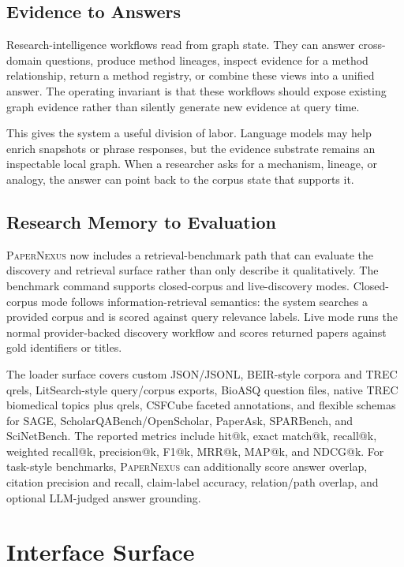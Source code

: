 \documentclass[11pt]{article}
\newcommand{\papernexus}{\textsc{PaperNexus}}
\begin{document}
\subsection{Evidence to Answers}

Research-intelligence workflows read from graph state. They can answer cross-domain questions, produce method lineages, inspect evidence for a method relationship, return a method registry, or combine these views into a unified answer. The operating invariant is that these workflows should expose existing graph evidence rather than silently generate new evidence at query time.

This gives the system a useful division of labor. Language models may help enrich snapshots or phrase responses, but the evidence substrate remains an inspectable local graph. When a researcher asks for a mechanism, lineage, or analogy, the answer can point back to the corpus state that supports it.

\subsection{Research Memory to Evaluation}

\papernexus{} now includes a retrieval-benchmark path that can evaluate the discovery and retrieval surface rather than only describe it qualitatively. The benchmark command supports closed-corpus and live-discovery modes. Closed-corpus mode follows information-retrieval semantics: the system searches a provided corpus and is scored against query relevance labels. Live mode runs the normal provider-backed discovery workflow and scores returned papers against gold identifiers or titles.

The loader surface covers custom JSON/JSONL, BEIR-style corpora and TREC qrels, LitSearch-style query/corpus exports, BioASQ question files, native TREC biomedical topics plus qrels, CSFCube faceted annotations, and flexible schemas for SAGE, ScholarQABench/OpenScholar, PaperAsk, SPARBench, and SciNetBench. The reported metrics include hit@k, exact match@k, recall@k, weighted recall@k, precision@k, F1@k, MRR@k, MAP@k, and NDCG@k. For task-style benchmarks, \papernexus{} can additionally score answer overlap, citation precision and recall, claim-label accuracy, relation/path overlap, and optional LLM-judged answer grounding.

\section{Interface Surface}
\end{document}
